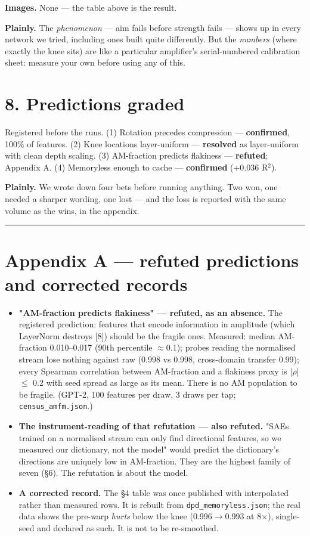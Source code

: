 \documentclass[10pt]{article}
\begin{document}
\textbf{Images.} None --- the table above is the result.

\textbf{Plainly.} The \emph{phenomenon} --- aim fails before strength fails --- shows up in every network we
tried, including ones built quite differently. But the \emph{numbers} (where exactly the knee sits) are
like a particular amplifier's serial-numbered calibration sheet: measure your own before using any
of this.

\section{8. Predictions graded}

Registered before the runs. (1) Rotation precedes compression --- \textbf{confirmed}, 100\% of features.
(2) Knee locations layer-uniform --- \textbf{resolved} as layer-uniform with clean depth scaling. (3)
AM-fraction predicts flakiness --- \textbf{refuted}; Appendix A. (4) Memoryless enough to cache ---
\textbf{confirmed} (+0.036 R$^{2}$).

\textbf{Plainly.} We wrote down four bets before running anything. Two won, one needed a sharper
wording, one lost --- and the loss is reported with the same volume as the wins, in the appendix.

\bigskip\hrule\bigskip

\section{Appendix A --- refuted predictions and corrected records}

\begin{itemize}\setlength\itemsep{1pt}
\item \textbf{"AM-fraction predicts flakiness" --- refuted, as an absence.} The registered prediction: features that encode information in amplitude (which LayerNorm destroys [8]) should be the fragile ones. Measured: median AM-fraction 0.010--0.017 (90th percentile $\approx$0.1); probes reading the normalised stream lose nothing against raw (0.998 vs 0.998, cross-domain transfer 0.99); every Spearman correlation between AM-fraction and a flakiness proxy is |$\rho$| $\le$ 0.2 with seed spread as large as its mean. There is no AM population to be fragile. (GPT-2, 100 features per draw, 3 draws per tap; \texttt{census\_amfm.json}.)
\item \textbf{The instrument-reading of that refutation --- also refuted.} "SAEs trained on a normalised stream can only find directional features, so we measured our dictionary, not the model" would predict the dictionary's directions are uniquely low in AM-fraction. They are the highest family of seven (§6). The refutation is about the model.
\item \textbf{A corrected record.} The §4 table was once published with interpolated rather than measured rows. It is rebuilt from \texttt{dpd\_memoryless.json}; the real data shows the pre-warp \emph{hurts} below the knee (0.996$\to$0.993 at 8$\times$), single-seed and declared as such. It is not to be re-smoothed.
\end{itemize}
\end{document}
